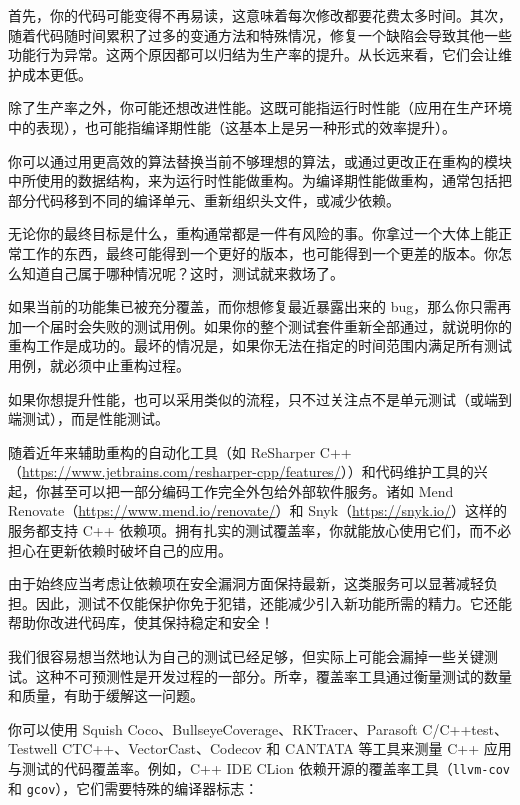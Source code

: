 首先，你的代码可能变得不再易读，这意味着每次修改都要花费太多时间。其次，随着代码随时间累积了过多的变通方法和特殊情况，修复一个缺陷会导致其他一些功能行为异常。这两个原因都可以归结为生产率的提升。从长远来看，它们会让维护成本更低。

除了生产率之外，你可能还想改进性能。这既可能指运行时性能（应用在生产环境中的表现），也可能指编译期性能（这基本上是另一种形式的效率提升）。

你可以通过用更高效的算法替换当前不够理想的算法，或通过更改正在重构的模块中所使用的数据结构，来为运行时性能做重构。为编译期性能做重构，通常包括把部分代码移到不同的编译单元、重新组织头文件，或减少依赖。

无论你的最终目标是什么，重构通常都是一件有风险的事。你拿过一个大体上能正常工作的东西，最终可能得到一个更好的版本，也可能得到一个更差的版本。你怎么知道自己属于哪种情况呢？这时，测试就来救场了。

如果当前的功能集已被充分覆盖，而你想修复最近暴露出来的 bug，那么你只需再加一个届时会失败的测试用例。如果你的整个测试套件重新全部通过，就说明你的重构工作是成功的。最坏的情况是，如果你无法在指定的时间范围内满足所有测试用例，就必须中止重构过程。

如果你想提升性能，也可以采用类似的流程，只不过关注点不是单元测试（或端到端测试），而是性能测试。

\label{idx:806}
\label{idx:807}
\label{idx:808}
随着近年来辅助重构的自动化工具（如 ReSharper C++（\href{https://www.jetbrains.com/resharper-cpp/features/}{https://www.jetbrains.com/resharper-cpp/features/}））和代码维护工具的兴起，你甚至可以把一部分编码工作完全外包给外部软件服务。诸如 Mend Renovate（\href{https://www.mend.io/renovate/}{https://www.mend.io/renovate/}）和 Snyk（\href{https://snyk.io/}{https://snyk.io/}）这样的服务都支持 C++ 依赖项。拥有扎实的测试覆盖率，你就能放心使用它们，而不必担心在更新依赖时破坏自己的应用。

由于始终应当考虑让依赖项在安全漏洞方面保持最新，这类服务可以显著减轻负担。因此，测试不仅能保护你免于犯错，还能减少引入新功能所需的精力。它还能帮助你改进代码库，使其保持稳定和安全！

\label{idx:809}
我们很容易想当然地认为自己的测试已经足够，但实际上可能会漏掉一些关键测试。这种不可预测性是开发过程的一部分。所幸，覆盖率工具通过衡量测试的数量和质量，有助于缓解这一问题。

你可以使用 Squish Coco、BullseyeCoverage、RKTracer、Parasoft C/C++test、Testwell CTC++、VectorCast、Codecov 和 CANTATA 等工具来测量 C++ 应用与测试的代码覆盖率。例如，C++ IDE CLion 依赖开源的覆盖率工具（\texttt{llvm-cov} 和 \texttt{gcov}），它们需要特殊的编译器标志：

